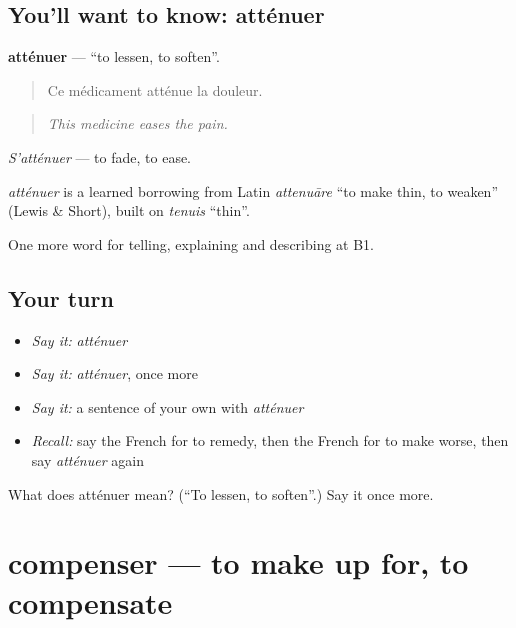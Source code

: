 \subsection*{You'll want to know: atténuer}
\textbf{atténuer} — \textquotedblleft{}to lessen, to soften\textquotedblright{}.

\begin{quote}
Ce médicament atténue la douleur.
\end{quote}

\begin{quote}
\emph{This medicine eases the pain.}
\end{quote}

\emph{S'atténuer} — to fade, to ease.

\begin{cousinweb}
\emph{atténuer} is a learned borrowing from Latin \emph{attenuāre} \textquotedblleft{}to make thin, to weaken\textquotedblright{} (Lewis \& Short), built on \emph{tenuis} \textquotedblleft{}thin\textquotedblright{}.
\end{cousinweb}

\begin{grammarlens}[title={What you've built}]
One more word for telling, explaining and describing at B1.
\end{grammarlens}

\subsection*{Your turn}
\begin{itemize}
\raggedright
  \item \emph{Say it:} \emph{atténuer}
  \item \emph{Say it:} \emph{atténuer}, once more
  \item \emph{Say it:} a sentence of your own with \emph{atténuer}
  \item \emph{Recall:} say the French for to remedy, then the French for to make worse, then say \emph{atténuer} again
\end{itemize}

\begin{tcolorbox}[breakable,colback=teal!4,colframe=teal!35!black,title={Before you move on}]
What does atténuer mean? (\textquotedblleft{}To lessen, to soften\textquotedblright{}.) Say it once more.
\end{tcolorbox}
\section[compenser]{compenser — to make up for, to compensate}

